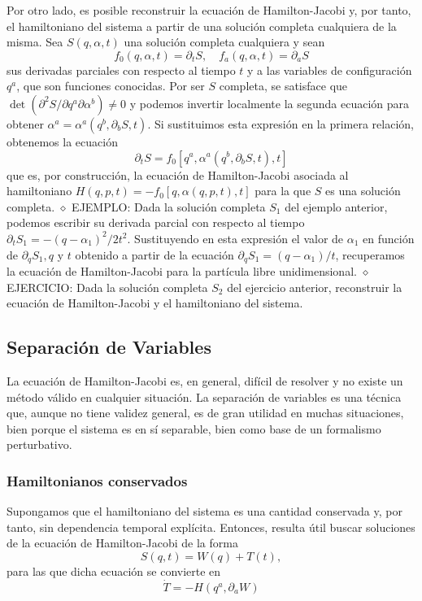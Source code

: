 Por otro lado, es posible reconstruir la ecuación de Hamilton-Jacobi y, por tanto, el hamiltoniano del sistema a partir de una solución completa cualquiera de la misma. Sea $S(q, \alpha, t)$ una solución completa cualquiera y sean
$$
f_{0}(q, \alpha, t)=\partial_{t} S, \quad f_{a}(q, \alpha, t)=\partial_{a} S
$$
sus derivadas parciales con respecto al tiempo $t$ y a las variables de configuración $q^{a}$, que son funciones conocidas. Por ser $S$ completa, se satisface que $\operatorname{det}\left(\partial^{2} S / \partial q^{a} \partial \alpha^{b}\right) \neq 0$ y podemos invertir localmente la segunda ecuación para obtener $\alpha^{a}=\alpha^{a}\left(q^{b}, \partial_{b} S, t\right)$. Si sustituimos esta expresión en la primera relación, obtenemos la ecuación
$$
\partial_{t} S=f_{0}\left[q^{a}, \alpha^{a}\left(q^{b}, \partial_{b} S, t\right), t\right]
$$
que es, por construcción, la ecuación de Hamilton-Jacobi asociada al hamiltoniano $H(q, p, t)=-f_{0}[q, \alpha(q, p, t), t]$ para la que $S$ es una solución completa.
$\diamond$ EJEMPLO: Dada la solución completa $S_{1}$ del ejemplo anterior, podemos escribir su derivada parcial con respecto al tiempo $\partial_{t} S_{1}=-\left(q-\alpha_{1}\right)^{2} / 2 t^{2}$. Sustituyendo en esta expresión el valor de $\alpha_{1}$ en función de $\partial_{q} S_{1}, q$ y $t$ obtenido a partir de la ecuación $\partial_{q} S_{1}=\left(q-\alpha_{1}\right) / t$, recuperamos la ecuación de Hamilton-Jacobi para la partícula libre unidimensional.
$\diamond$ EJERCICIO: Dada la solución completa $S_{2}$ del ejercicio anterior, reconstruir la ecuación de Hamilton-Jacobi y el hamiltoniano del sistema.
\subsection{Separación de Variables}
La ecuación de Hamilton-Jacobi es, en general, difícil de resolver y no existe un método válido en cualquier situación. La separación de variables es una técnica que, aunque no tiene validez general, es de gran utilidad en muchas situaciones, bien porque el sistema es en sí separable, bien como base de un formalismo perturbativo.
\subsubsection{Hamiltonianos conservados}
Supongamos que el hamiltoniano del sistema es una cantidad conservada y, por tanto, sin dependencia temporal explícita. Entonces, resulta útil buscar soluciones de la ecuación de Hamilton-Jacobi de la forma
$$
S(q, t)=W(q)+T(t),
$$
para las que dicha ecuación se convierte en
$$
\dot{T}=-H\left(q^{a}, \partial_{a} W\right)
$$

